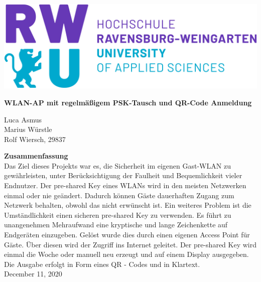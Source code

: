 \documentclass[a4paper,11pt,singlespacing]{article}
\begin{document}
    
 \setlength{\parindent}{0ex}
    	
\begin{titlepage}
    \begin{center}
    \includegraphics[scale=0.3]{rwu_logo_hor-lila-cyan_rgb_0}
        \vspace*{1.5cm}
        
        \Huge
        \textbf{WLAN-AP mit regelmäßigem PSK-Tausch und QR-Code Anmeldung}
            
        \vspace{1.4cm}
        \normalsize
        Luca Asmus\\ Marius Würstle\\Rolf Wiersch, 29837
            
        \vspace{1.0cm}
        
          \normalsize
        \textbf{Zusammenfassung}\\
    	Das Ziel dieses Projekts war es, die Sicherheit im eigenen Gast-WLAN zu gewährleisten, unter Berücksichtigung der Faulheit und Bequemlichkeit vieler Endnutzer. Der pre-shared Key eines WLANs wird in den meisten Netzwerken einmal oder nie geändert. Dadurch können Gäste dauerhaften Zugang zum Netzwerk behalten, obwohl das nicht erwünscht ist. Ein weiteres Problem ist die Umständlichkeit einen sicheren pre-shared Key zu verwenden. Es führt zu unangenehmen Mehraufwand eine kryptische und lange Zeichenkette auf Endgeräten einzugeben. Gelöst wurde dies durch einen eigenen Access Point für Gäste. Über diesen wird der Zugriff ins Internet geleitet. Der pre-shared Key wird einmal die Woche oder manuell neu erzeugt und auf einem Display ausgegeben. Die Ausgabe erfolgt in Form eines QR - Codes und in Klartext.   \\
        
        \vspace{2.0cm}
        December 11, 2020
        
        \vspace{0.8cm}
          
            
    \end{center}
\end{titlepage}
    	
\end{document}
